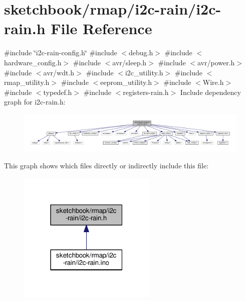 \hypertarget{i2c-rain_8h}{}\section{sketchbook/rmap/i2c-\/rain/i2c-\/rain.h File Reference}
\label{i2c-rain_8h}
{\ttfamily \#include \char`\"{}i2c-\/rain-\/config.\+h\char`\"{}}\newline
{\ttfamily \#include $<$debug.\+h$>$}\newline
{\ttfamily \#include $<$hardware\+\_\+config.\+h$>$}\newline
{\ttfamily \#include $<$avr/sleep.\+h$>$}\newline
{\ttfamily \#include $<$avr/power.\+h$>$}\newline
{\ttfamily \#include $<$avr/wdt.\+h$>$}\newline
{\ttfamily \#include $<$i2c\+\_\+utility.\+h$>$}\newline
{\ttfamily \#include $<$rmap\+\_\+utility.\+h$>$}\newline
{\ttfamily \#include $<$eeprom\+\_\+utility.\+h$>$}\newline
{\ttfamily \#include $<$Wire.\+h$>$}\newline
{\ttfamily \#include $<$typedef.\+h$>$}\newline
{\ttfamily \#include $<$registers-\/rain.\+h$>$}\newline
Include dependency graph for i2c-\/rain.h\+:
\nopagebreak
\begin{figure}[H]
\begin{center}
\leavevmode
\includegraphics[width=350pt]{i2c-rain_8h__incl}
\end{center}
\end{figure}
This graph shows which files directly or indirectly include this file\+:
\nopagebreak
\begin{figure}[H]
\begin{center}
\leavevmode
\includegraphics[width=187pt]{i2c-rain_8h__dep__incl}
\end{center}
\end{figure}
